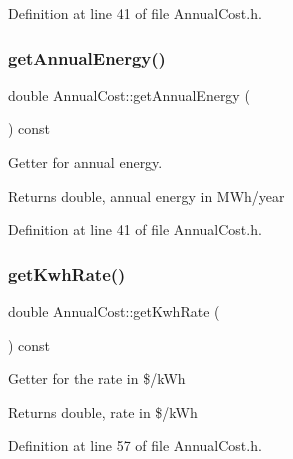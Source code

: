 Definition at line 41 of file Annual\+Cost.\+h.

\mbox{\label{class_annual_cost_a0e217b7df05e6a03503e14d96570a192}} 
\subsubsection{\texorpdfstring{get\+Annual\+Energy()}{getAnnualEnergy()}\hspace{0.1cm}{\footnotesize\ttfamily [3/3]}}
{\footnotesize\ttfamily double Annual\+Cost\+::get\+Annual\+Energy (\begin{DoxyParamCaption}{ }\end{DoxyParamCaption}) const\hspace{0.3cm}{\ttfamily [inline]}}

Getter for annual energy. \begin{DoxyReturn}{Returns}
double, annual energy in M\+Wh/year 
\end{DoxyReturn}


Definition at line 41 of file Annual\+Cost.\+h.

\mbox{\label{class_annual_cost_ac01ed415360b6f52f61ec8a581333c29}} 
\subsubsection{\texorpdfstring{get\+Kwh\+Rate()}{getKwhRate()}\hspace{0.1cm}{\footnotesize\ttfamily [1/3]}}
{\footnotesize\ttfamily double Annual\+Cost\+::get\+Kwh\+Rate (\begin{DoxyParamCaption}{ }\end{DoxyParamCaption}) const\hspace{0.3cm}{\ttfamily [inline]}}

Getter for the rate in \$/k\+Wh \begin{DoxyReturn}{Returns}
double, rate in \$/k\+Wh 
\end{DoxyReturn}


Definition at line 57 of file Annual\+Cost.\+h.

\mbox{\label{class_annual_cost_ac01ed415360b6f52f61ec8a581333c29}} 
